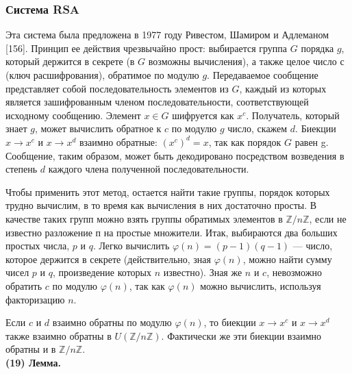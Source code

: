 \subsubsection{Система RSA}
\par
 Эта система была предложена в 1977 году Ривестом, Шамиром и
Адлеманом [156]. Принцип ее действия чрезвычайно прост: выбирается
группа $G$ порядка $g$, который держится в секрете (в $G$ возможны 
вычисления), а также целое число $с$ (ключ расшифрования), обратимое по
модулю $g$. Передаваемое сообщение представляет собой 
последовательность элементов из $G$, каждый из которых является зашифрованным
членом последовательности, соответствующей исходному сообщению.
Элемент $x \in G$ шифруется как $x^c$. Получатель, который знает $g$, может
вычислить обратное к $c$ по модулю $g$ число, скажем $d$. Биекции $x \rightarrow x^c$ и $x \rightarrow x^d$ взаимно обратные: $(x^{c})^{d} = x$, так как порядок $G$ равен g. Сообщение, таким образом, может быть декодировано посредством возведения в степень $d$ каждого члена полученной последовательности.\par
  Чтобы применить этот метод, остается найти такие группы, 
порядок которых трудно вычислим, в то время как вычисления в них 
достаточно просты. В качестве таких групп можно взять группы обратимых
элементов в $\mathbb{Z}/n\mathbb{Z}$, если не известно разложение п на простые множители. Итак, выбираются два больших простых числа, $p$ и $q$. Легко 
вычислить $\varphi(n) = (p - 1)(q - 1)$ --- число, которое держится в секрете (действительно, зная $\varphi (n)$, можно найти сумму чисел $p$ и $q$, произведение которых $n$ известно). Зная же $n$ и $c$, невозможно обратить $c$ по модулю $\varphi (n)$, так как $\varphi (n)$ можно вычислить, используя факторизацию $n$.\par
 Если $c$ и $d$ взаимно обратны по модулю $\varphi(n)$, то биекции $x \rightarrow x^c$ и $x \rightarrow x^d$ также взаимно обратны в $U(\mathbb{Z}/n\mathbb{Z})$. Фактически же эти биекции взаимно обратны и в $\mathbb{Z}/n\mathbb{Z}$. \\
 
\textbf{(19) Лемма.} \\

